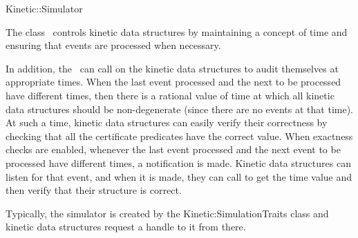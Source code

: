 

\begin{ccRefConcept}{Kinetic::Simulator}  %


\ccDefinition
  
The class \ccRefName\ controls kinetic data structures by maintaining
a concept of time and ensuring that events are processed when
necessary. 

In addition, the \ccRefName\ can call on the kinetic data structures
to audit themselves at appropriate times. When the last event
processed and the next to be processed have different times, then
there is a rational value of time at which all kinetic data structures
should be non-degenerate (since there are no events at that time). At
such a time, kinetic data structures can easily verify their
correctness by checking that all the certificate predicates have the
correct value. When exactness checks are enabled, whenever the last
event processed and the next event to be processed have different
times, a
 notification is made. Kinetic
data structures can listen for that event, and when it is made, they
can call  to get the time value and
then verify that their structure is correct.

Typically, the simulator is created by the Kinetic:SimulationTraits
class and kinetic data structures request a handle to it from there.


\ccTypes




\end{ccRefConcept}
